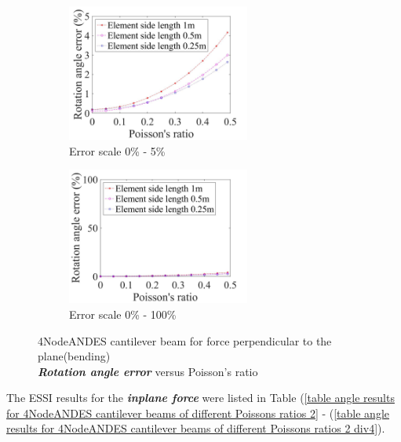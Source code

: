 \documentclass[fleqn,11pt,letter]{article}
\begin{document}
\begin{figure}[H]
  \begin{subfigure}{0.5\textwidth}
    \centering
    \includegraphics[width=6cm]{../Figure_files/4NodeANDES/error4andes_beam_dif_poisson_angle_bend_div.jpeg}
    \caption{Error scale 0\% - 5\%}
  \end{subfigure}
  \begin{subfigure}{0.5\textwidth}
    \centering
    \includegraphics[width=6cm]{../Figure_files/4NodeANDES/error4andes_beam_dif_poisson_angle_bend_div100.jpeg}
    \caption{Error scale 0\% - 100\%}
  \end{subfigure}
  \captionsetup{justification=centering,margin=2cm}
  \caption{4NodeANDES cantilever beam for force perpendicular to the plane(bending)\\
      \emph{\textbf{Rotation angle error}}   versus   Poisson's ratio}
  \label{table angle error 4NodeANDES cantilever beam for different Poisson ratio}
\end{figure}











The ESSI results for the \textbf{\emph{inplane force}} were listed in Table (\ref{table angle results for 4NodeANDES cantilever beams of different Poissons ratios 2} - (\ref{table angle results for 4NodeANDES cantilever beams of different Poissons ratios 2 div4}). 
\end{document}
